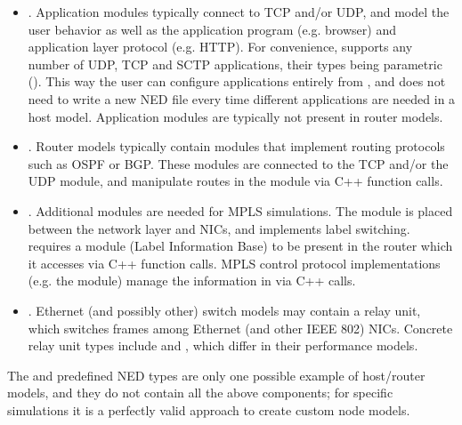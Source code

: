 \begin{itemize}
\item \sloppypar {}. Application modules typically connect to TCP
and/or UDP, and model the user behavior as well as the application program
(e.g. browser) and application layer protocol (e.g. HTTP). For convenience,
 supports any number of UDP, TCP and SCTP
applications, their types being parametric (). This way the user can configure applications entirely from
, and does not need to write a new NED file every time
different applications are needed in a host model. Application modules
are typically not present in router models.

\item {}. Router models typically contain modules that
implement routing protocols such as OSPF or BGP. These modules are
connected to the TCP and/or the UDP module, and manipulate routes in the
 module via C++ function calls.

\item {}. Additional modules are needed for MPLS
simulations. The  module is placed between the network layer
and NICs, and implements label switching.  requires a
 module (Label Information Base) to be present in the router
which it accesses via C++ function calls. MPLS control protocol
implementations (e.g. the  module) manage the information in
 via C++ calls.

\item {}. Ethernet (and possibly other) switch models may
contain a relay unit, which switches frames among Ethernet (and other
IEEE 802) NICs. Concrete relay unit types include 
and , which differ in their performance models.

\iffalse TODO
\item \tbf{Power consumption}. INET extensions uses for wireless sensor
networks (WSNs) may add a battery module to the node model. The battery
module would keep track of energy consumption. A battery module is provided
e.g. by the INETMANET project.
\fi

\end{itemize}

The  and  predefined NED types are
only one possible example of host/router models, and they do not contain
all the above components; for specific simulations it is a perfectly
valid approach to create custom node models.

